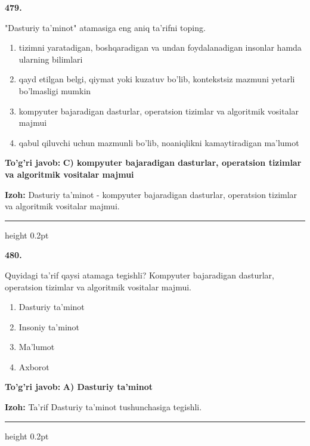 \documentclass[10pt,a4paper]{article}
\begin{document}
{\bfseries\sffamily\color{ink} 479.}
\par
"Dasturiy ta'minot" atamasiga eng aniq ta'rifni toping.
\begin{enumerate}[label=\Alph*),leftmargin=9mm]
\item tizimni yaratadigan, boshqaradigan va undan foydalanadigan insonlar hamda ularning bilimlari
\item qayd etilgan belgi, qiymat yoki kuzatuv bo'lib, kontekstsiz mazmuni yetarli bo'lmasligi mumkin
\item kompyuter bajaradigan dasturlar, operatsion tizimlar va algoritmik vositalar majmui
\item qabul qiluvchi uchun mazmunli bo'lib, noaniqlikni kamaytiradigan ma'lumot
\end{enumerate}
\begin{tcolorbox}[enhanced,breakable,colback=teal!4,colframe=teal!60!black,boxrule=0.45pt,arc=1.2mm,left=2.7mm,right=2.7mm,top=1.8mm,bottom=1.8mm,before skip=2mm,after skip=2mm]
{\bfseries\sffamily\color{teal}To'g'ri javob:} \textbf{C) kompyuter bajaradigan dasturlar, operatsion tizimlar va algoritmik vositalar majmui}
\par\smallskip
{\bfseries Izoh:} Dasturiy ta'minot - kompyuter bajaradigan dasturlar, operatsion tizimlar va algoritmik vositalar majmui.
\end{tcolorbox}
\vspace{2mm}\hrule height 0.2pt\vspace{3mm}

{\bfseries\sffamily\color{ink} 480.}
\par
Quyidagi ta'rif qaysi atamaga tegishli? Kompyuter bajaradigan dasturlar, operatsion tizimlar va algoritmik vositalar majmui.
\begin{enumerate}[label=\Alph*),leftmargin=9mm]
\item Dasturiy ta'minot
\item Insoniy ta'minot
\item Ma'lumot
\item Axborot
\end{enumerate}
\begin{tcolorbox}[enhanced,breakable,colback=teal!4,colframe=teal!60!black,boxrule=0.45pt,arc=1.2mm,left=2.7mm,right=2.7mm,top=1.8mm,bottom=1.8mm,before skip=2mm,after skip=2mm]
{\bfseries\sffamily\color{teal}To'g'ri javob:} \textbf{A) Dasturiy ta'minot}
\par\smallskip
{\bfseries Izoh:} Ta'rif Dasturiy ta'minot tushunchasiga tegishli.
\end{tcolorbox}
\vspace{2mm}\hrule height 0.2pt\vspace{3mm}
\end{document}
